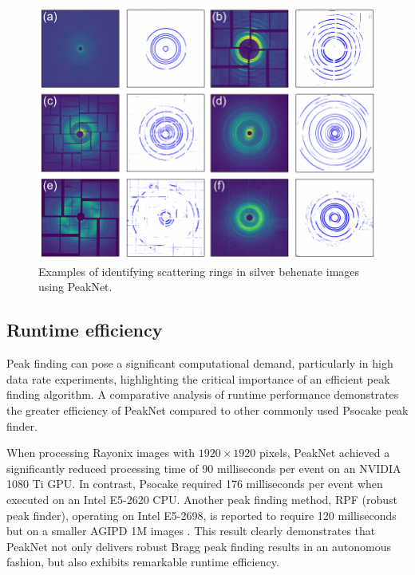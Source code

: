 \documentclass[a4paper]{article}
\newcommand{\peaknet}{PeakNet}
\newcommand{\psocake}{Psocake}
\begin{document}
\begin{figure}[!ht]
\centering
\includegraphics[width=\textwidth,keepaspectratio]
{./figures/automask.agbehnate.pdf}
\caption{Examples of identifying scattering rings in silver behenate images using
\peaknet{}.}
\label{fig : automask 2}
\end{figure}


\subsection{Runtime efficiency}

Peak finding can pose a significant computational demand, particularly in high data rate experiments, highlighting the critical importance of an efficient peak finding algorithm.  A comparative analysis of runtime performance demonstrates the greater efficiency of \peaknet{} compared to other commonly used \psocake{} peak finder.

When processing Rayonix images with $1920 \times 1920$ pixels, \peaknet{} achieved a significantly reduced processing time of 90 milliseconds per event on an NVIDIA 1080 Ti GPU.  In contrast, \psocake{} required 176 milliseconds per event when executed on an Intel E5-2620 CPU.  Another peak finding method, RPF (robust peak finder), operating on Intel E5-2698, is reported to require 120 milliseconds but on a smaller AGIPD 1M images \citep{hadian-jaziDataReductionSerial2021}.  This result clearly demonstrates that \peaknet{} not only delivers robust Bragg peak finding results in an autonomous fashion, but also exhibits remarkable runtime efficiency.  %
\end{document}
